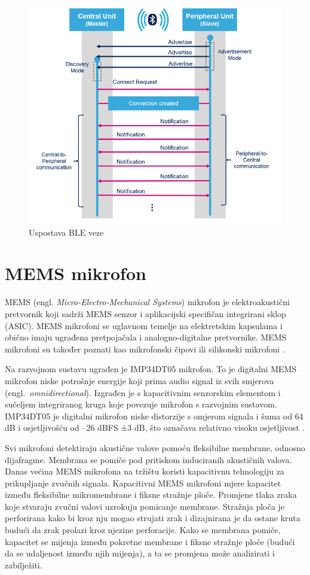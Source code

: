 \begin{figure}[ht]
	\centering
	\includegraphics[scale=0.7]{imgs/ble_connection_setup}
	\caption{Uspostava BLE veze \cite{fpaudbvlink}}
	\label{fig:ble_connection_setup}
\end{figure}


\section{MEMS mikrofon}

MEMS (engl. \textit{Micro-Electro-Mechanical Systems}) mikrofon je elektroakustični pretvornik koji sadrži MEMS senzor i aplikacijski specifičan integrirani sklop (ASIC). MEMS mikrofoni se uglavnom temelje na elektretskim kapsulama i obično imaju ugrađena pretpojačala i analogno-digitalne pretvornike. MEMS mikrofoni su također poznati kao mikrofonski čipovi ili silikonski mikrofoni \cite{whatismems}. 

Na razvojnom sustavu ugrađen je IMP34DT05 mikrofon. To je digitalni MEMS mikrofon niske potrošnje energije koji prima audio signal iz svih smjerova (engl.~\textit{omnidirectional}). Izgrađen je s kapacitivnim senzorskim elementom i sučeljem integriranog kruga koje povezuje mikrofon s razvojnim sustavom. IMP34DT05 je digitalni mikrofon niske distorzije s omjerom signala i šuma od 64 dB i osjetljivošću od –26 dBFS ±3 dB, što označava relativno visoku osjetljivost \cite{memsdb}.

Svi mikrofoni detektiraju akustične valove pomoću fleksibilne membrane, odnosno dijafragme. Membrana se pomiče pod pritiskom induciranih akustičnih valova. Danas većina MEMS mikrofona na tržištu koristi kapacitivnu tehnologiju za prikupljanje zvučnih signala. Kapacitivni MEMS mikrofoni mjere kapacitet između fleksibilne mikromembrane i fiksne stražnje ploče. Promjene tlaka zraka koje stvaraju zvučni valovi uzrokuju pomicanje membrane. Stražnja ploča je perforirana kako bi kroz nju mogao strujati zrak i dizajnirana je da ostane kruta budući da zrak prolazi kroz njezine perforacije. Kako se membrana pomiče, kapacitet se mijenja između pokretne membrane i fiksne stražnje ploče (budući da se udaljenost između njih mijenja), a ta se promjena može analizirati i zabilježiti.

